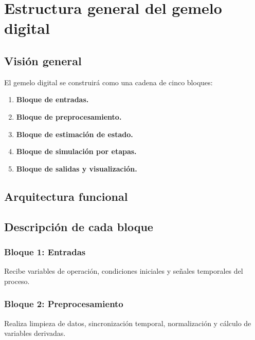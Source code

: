 \documentclass[12pt,a4paper]{report}
\begin{document}
\chapter{Estructura general del gemelo digital}

\section{Visión general}

El gemelo digital se construirá como una cadena de cinco bloques:

\begin{enumerate}[leftmargin=0.8cm]
    \item \textbf{Bloque de entradas.}
    \item \textbf{Bloque de preprocesamiento.}
    \item \textbf{Bloque de estimación de estado.}
    \item \textbf{Bloque de simulación por etapas.}
    \item \textbf{Bloque de salidas y visualización.}
\end{enumerate}

\section{Arquitectura funcional}

\begin{center}
\end{center}

\section{Descripción de cada bloque}

\subsection{Bloque 1: Entradas}
Recibe variables de operación, condiciones iniciales y señales temporales del proceso.

\subsection{Bloque 2: Preprocesamiento}
Realiza limpieza de datos, sincronización temporal, normalización y cálculo de variables derivadas.
\end{document}
